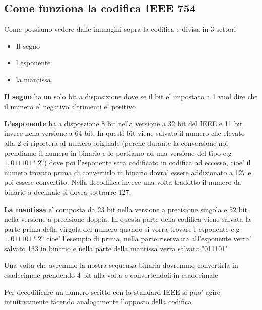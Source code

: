 \documentclass{article}
\begin{document}
          \subsection{Come funziona la codifica IEEE 754}
          \begin{flushleft}
           Come possiamo vedere dalle immagini sopra la codifica e divisa in 3 settori
          \end{flushleft}
          \begin{itemize}
            \item Il segno 
            \item l esponente
            \item la mantissa
          \end{itemize}
          \begin{flushleft}
            \textbf{Il segno} ha un solo bit a disposizione dove se il bit e' impostato a 1 
            vuol dire che il numero e' negativo altrimenti e' positivo
          \end{flushleft}
          \begin{flushleft}
            \textbf{L'esponente} ha a disposzione 8 bit nella versione a 32 bit del IEEE e 11 bit
            invece nella versione a 64 bit. In questi bit viene salvato il numero che elevato alla
            2 ci riportera al numero originale (perche durante la conversione noi prendiamo il numero
            in binario e lo portiamo ad una versione del tipo e.g $1,011101 * 2^6$) dove poi l'esponente
            sara codificato in codifica ad eccesso, cioe' il numero trovato prima di convertirlo in binario
            dovra' essere addizionato a 127 e poi essere convertito. Nella decodifica invece una volta tradotto
            il numero da binario a decimale si dovra sottrarre 127.
          \end{flushleft}
          \begin{flushleft}
            \textbf{La mantissa} e' composta da 23 bit nella versione a precisione singola e 52 bit
            nella versione a precisione doppia. In questa parte della codifica viene salvata la parte
            prima della virgola del numero quando si vorra trovare l esponente e.g $1,011101 * 2^6$
            cioe' l'esempio di prima, nella parte riservaata all'esponente verra' salvato 133 in binario
            e nella parte della mantissa verra salvato "011101"
          \end{flushleft}
          \begin{flushleft}
            Una volta che avremmo la nostra sequenza binaria dovremmo convertirla in esadecimale 
            prendendo 4 bit alla volta e convertendoli in esadecimale 
          \end{flushleft}
          \begin{flushleft}
            Per decodificare un numero scritto con lo standard IEEE si puo' agire intuitivamente
            facendo analogamente l'opposto della codifica
          \end{flushleft}
\end{document}
